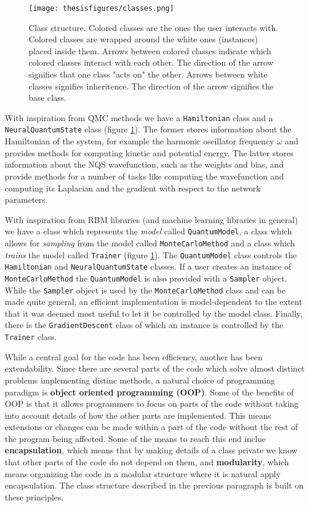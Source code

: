\documentclass[twoside,english]{uiofysmaster}
\begin{document}
\begin{figure}
\centering
 \texttt{[image: thesisfigures/classes.png]}
 \caption{Class structure. Colored classes are the ones the user interacts with. Colored classes are wrapped around the white ones (instances) placed inside them. Arrows between colored classes indicate which colored classes interact with each other. The direction of the arrow signifies that one class "acts on" the other. Arrows between white classes signifies inheritence. The direction of the arrow signifies the base class.}
 \label{fig:classes}
\end{figure}


With inspiration from QMC methods we have a \texttt{Hamiltonian} class and a \texttt{NeuralQuantumState} class (figure \ref{fig:classes}). The former stores information about the Hamiltonian of the system, for example the harmonic oscillator frequency $\omega$ and provides methods for computing kinetic and potential energy. The latter stores information about the NQS wavefunction, such as the weights and bias, and provide methods for a number of tasks like computing the wavefunction and computing its Laplacian and the gradient with respect to the network parameters.

With inspiration from RBM libraries (and machine learning libraries in general) we have a class which represents the \textit{model} called \texttt{QuantumModel}, a class which allows for \textit{sampling} from the model called \texttt{MonteCarloMethod} and a class which \textit{trains} the model called \texttt{Trainer} (figure \ref{fig:classes}). The \texttt{QuantumModel} class controls the \texttt{Hamiltonian} and \texttt{NeuralQuantumState} classes. If a user creates an instance of \texttt{MonteCarloMethod} the \texttt{QuantumModel} is also provided with a \texttt{Sampler} object. While the \texttt{Sampler} object is used by the \texttt{MonteCarloMethod} class and can be made quite general, an efficient implementation is model-dependent to the extent that it was deemed most useful to let it be controlled by the model class. Finally, there is the \texttt{GradientDescent} class of which an instance is controlled by the \texttt{Trainer} class.

While a central goal for the code has been efficiency, another has been extendability. Since there are several parts of the code which solve almost distinct problems implementing distinc methods, a natural choice of programming paradigm is \textbf{object oriented programming (OOP)}. Some of the benefits of OOP is that it allows programmers to focus on parts of the code without taking into account details of how the other parts are implemented. This means extensions or changes can be made within a part of the code without the rest of the program being affected. Some of the means to reach this end inclue \textbf{encapsulation}, which means that by making details of a class private we know that other parts of the code do not depend on them, and \textbf{modularity}, which means organizing the code in a modular structure where it is natural apply encapsulation. The class structure described in the previous paragraph is built on these principles. 
\end{document}
